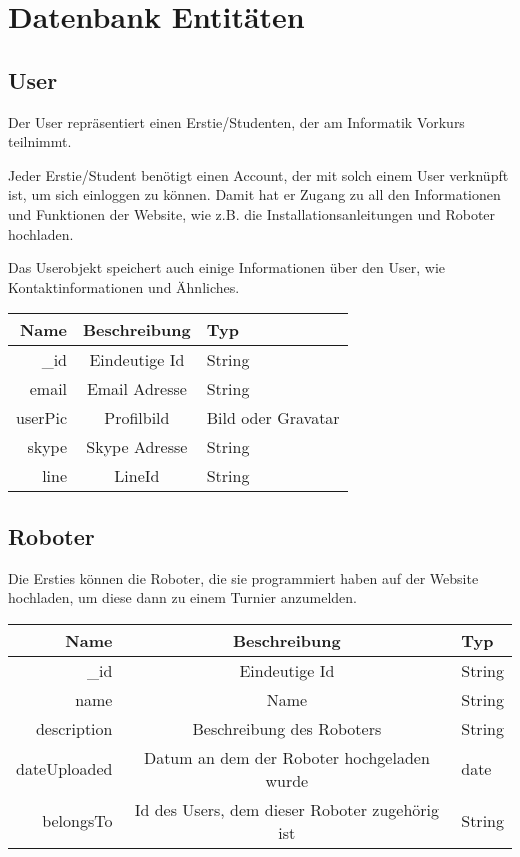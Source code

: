 \documentclass[Info_VK_Website_Dokumentation.tex]{subfiles}
\begin{document}
	
\chapter{Datenbank Entitäten}

\section{User}

Der User repräsentiert einen Erstie/Studenten, der am Informatik Vorkurs teilnimmt.

Jeder Erstie/Student benötigt einen Account, der mit solch einem User verknüpft ist, um sich einloggen zu können. Damit hat er Zugang zu all den Informationen und Funktionen der Website, wie z.B. die Installationsanleitungen und Roboter hochladen.

Das Userobjekt speichert auch einige Informationen über den User, wie Kontaktinformationen und Ähnliches.

\begin{table}[H]
\centering
\begin{tabular}{r | c | l}
\textbf{Name} & \textbf{Beschreibung} & \textbf{Typ} \\
\hline
\hline
\_id  & Eindeutige Id & String \\
\hline
email   & Email Adresse & String \\
\hline
userPic & Profilbild   & Bild oder Gravatar \\
\hline
skype & Skype Adresse & String \\
\hline
line  & LineId        & String \\

\end{tabular}
\end{table}


\section{Roboter}

Die Ersties können die Roboter, die sie programmiert haben auf der Website hochladen, um diese dann zu einem Turnier anzumelden.


\begin{table}[H]
\centering
\begin{tabular}{ r | c | l }
\textbf{Name} & \textbf{Beschreibung} & \textbf{Typ} \\
\hline
\hline
\_id       & Eindeutige Id & String \\
\hline
name     & Name          & String \\
\hline
description & Beschreibung des Roboters & String \\
\hline
dateUploaded & Datum an dem der Roboter hochgeladen wurde & date \\ 
\hline
belongsTo & Id des Users, dem dieser Roboter zugehörig ist & String \\
\end{tabular}
\end{table}
\end{document}
